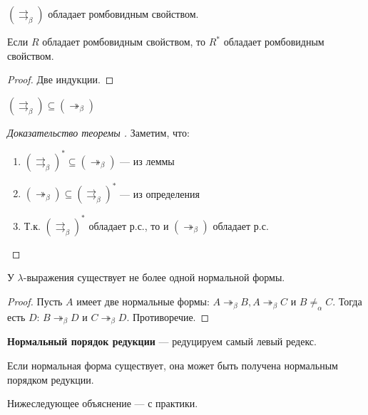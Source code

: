 \begin{lemma}
    \((\rightrightarrows_\beta)\) обладает ромбовидным свойством.
\end{lemma}

\begin{lemma}
    Если \(R\) обладает ромбовидным свойством, то \(R^*\) обладает ромбовидным свойством.
\end{lemma}
\begin{proof}
    Две индукции.
\end{proof}

\begin{lemma}
    \((\rightrightarrows_\beta) \subseteq ( \twoheadrightarrow_\beta)\)
\end{lemma}

\begin{proof}[Доказательство теоремы ]
    Заметим, что:
    \begin{enumerate}
        \item \((\rightrightarrows_\beta)^* \subseteq ( \twoheadrightarrow_\beta)\) --- из леммы
        \item \(( \twoheadrightarrow_\beta) \subseteq (\rightrightarrows_\beta)^*\) --- из определения
        \item Т.к. \((\rightrightarrows_\beta)^*\) обладает р.с., то и \(( \twoheadrightarrow_\beta)\) обладает р.с.
    \end{enumerate}
\end{proof}

\begin{corollary}
    У \(\lambda\)-выражения существует не более одной нормальной формы.
\end{corollary}
\begin{proof}
    Пусть \(A\) имеет две нормальные формы: \(A \twoheadrightarrow_\beta B, A \twoheadrightarrow_\beta C\) и \(B \neq_\alpha C\). Тогда есть \(D\): \(B \twoheadrightarrow_\beta D\) и \(C \twoheadrightarrow_\beta D\). Противоречие.
\end{proof}

\begin{definition}
    \textbf{Нормальный порядок редукции} --- редуцируем самый левый редекс.
\end{definition}

\begin{theorem}
    Если нормальная форма существует, она может быть получена нормальным порядком редукции.
\end{theorem}

\begin{remark}
    Нижеследующее объяснение --- с практики.
\end{remark}

